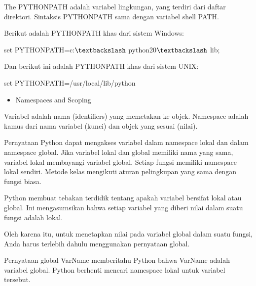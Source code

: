 \vspace{\baselineskip}
\noindent The PYTHONPATH adalah variabel lingkungan, yang terdiri dari daftar direktori. Sintaksis PYTHONPATH sama dengan variabel shell PATH.\par

\vspace{\baselineskip}
\noindent Berikut adalah PYTHONPATH khas dari sistem Windows:\par
\noindent \hspace*{0.5in}set PYTHONPATH=c:$\textbackslash$ python20$\textbackslash$ lib;\par
\vspace{\baselineskip}
\noindent Dan berikut ini adalah PYTHONPATH khas dari sistem UNIX:\par
\noindent \hspace*{0.5in}set PYTHONPATH=/usr/local/lib/python\par


\vspace{\baselineskip}
\begin{itemize}
	\item Namespaces and Scoping
\end{itemize}

\noindent Variabel adalah nama (identifiers) yang memetakan ke objek. Namespace adalah kamus dari nama variabel (kunci) dan objek yang sesuai (nilai).\par

\vspace{\baselineskip}
\noindent Pernyataan Python dapat mengakses variabel dalam namespace lokal dan dalam namespace global. Jika variabel lokal dan global memiliki nama yang sama, variabel lokal membayangi variabel global. Setiap fungsi memiliki namespace lokal sendiri. Metode kelas mengikuti aturan pelingkupan yang sama dengan fungsi biasa.\par

\vspace{\baselineskip}
\noindent Python membuat tebakan terdidik tentang apakah variabel bersifat lokal atau global. Ini mengasumsikan bahwa setiap variabel yang diberi nilai dalam suatu fungsi adalah lokal.\par
\vspace{\baselineskip}
\noindent Oleh karena itu, untuk menetapkan nilai pada variabel global dalam suatu fungsi, Anda harus terlebih dahulu menggunakan pernyataan global.\par

\vspace{\baselineskip}
\noindent Pernyataan global VarName memberitahu Python bahwa VarName adalah variabel global. Python berhenti mencari namespace lokal untuk variabel tersebut.\par

